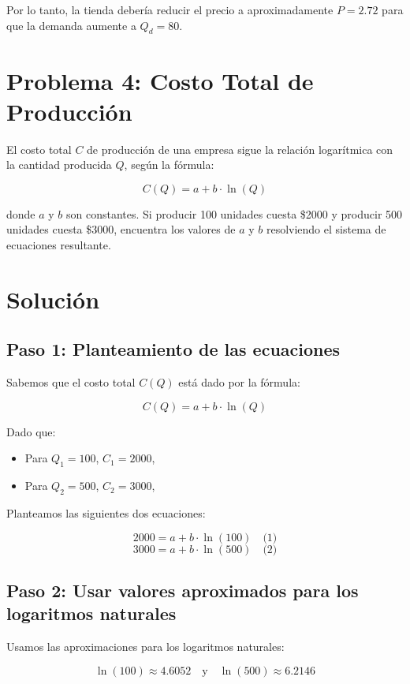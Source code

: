 \documentclass{article}
\begin{document}
Por lo tanto, la tienda debería reducir el precio a aproximadamente \(P = 2.72\) para que la demanda aumente a \(Q_d = 80\).

\section*{Problema 4: Costo Total de Producción}

El costo total \(C\) de producción de una empresa sigue la relación logarítmica con la cantidad producida \(Q\), según la fórmula:

\[
C(Q) = a + b \cdot \ln(Q)
\]

donde \(a\) y \(b\) son constantes. Si producir 100 unidades cuesta \$2000 y producir 500 unidades cuesta \$3000, encuentra los valores de \(a\) y \(b\) resolviendo el sistema de ecuaciones resultante.

\section*{Solución}

\subsection*{Paso 1: Planteamiento de las ecuaciones}

Sabemos que el costo total \(C(Q)\) está dado por la fórmula:

\[
C(Q) = a + b \cdot \ln(Q)
\]

Dado que:
\begin{itemize}
    \item Para \(Q_1 = 100\), \(C_1 = 2000\),
    \item Para \(Q_2 = 500\), \(C_2 = 3000\),
\end{itemize}

Planteamos las siguientes dos ecuaciones:

\[
2000 = a + b \cdot \ln(100) \quad \text{(1)}
\]
\[
3000 = a + b \cdot \ln(500) \quad \text{(2)}
\]

\subsection*{Paso 2: Usar valores aproximados para los logaritmos naturales}

Usamos las aproximaciones para los logaritmos naturales:

\[
\ln(100) \approx 4.6052 \quad \text{y} \quad \ln(500) \approx 6.2146
\]
\end{document}
